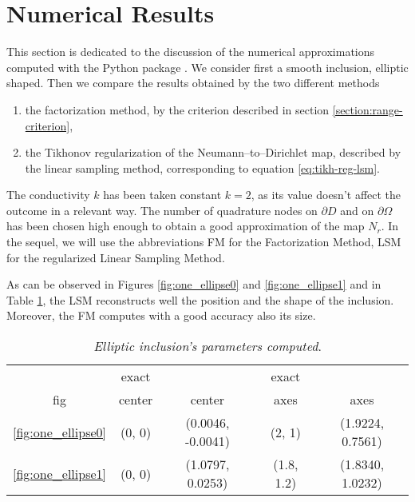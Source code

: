 \section{Numerical Results}
This section is dedicated to the discussion of the numerical approximations computed with the 
Python package \cite{}.
We consider first a smooth inclusion, elliptic shaped. Then we compare the results obtained by 
the two different methods
\begin{enumerate}
 \item the factorization method, by the criterion described in section \ref{section:range-criterion},
 \item the Tikhonov regularization of the Neumann--to--Dirichlet map, described by the linear
 sampling method, corresponding to equation \eqref{eq:tikh-reg-lsm}.
\end{enumerate}
The conductivity $k$ has been taken constant $k=2$, as its value doesn't 
affect the outcome in a relevant way. The number of quadrature nodes 
on $\partial D$ and on $\partial \Omega$ has been chosen high enough to obtain a good approximation 
of the map $N_r$.
In the sequel, we will use the abbreviations FM for the Factorization Method, LSM for the regularized 
Linear Sampling Method.
\par
As can be observed in Figures \ref{fig:one_ellipse0} and \ref{fig:one_ellipse1} and 
in Table \ref{tab:ellipse-parameters}, the LSM reconstructs well the position and the shape 
of the inclusion. Moreover, the FM computes with a good accuracy also its size. 

\begin{table}
\caption{\emph{Elliptic inclusion's parameters computed}.}
\label{tab:ellipse-parameters}
\begin{center}
\vspace*{-0.5cm}
\begin{tabular}{ccccc}
\toprule
 & exact && exact &\\
 fig & center & center & axes  & axes \\
\midrule
\ref{fig:one_ellipse0} & (0, 0) &  (0.0046, -0.0041) & (2, 1) & (1.9224, 0.7561) \\
\ref{fig:one_ellipse1} & (0, 0) &  (1.0797, 0.0253) & (1.8, 1.2) & (1.8340, 1.0232) \\
\bottomrule
\end{tabular}
\end{center}
\end{table}

